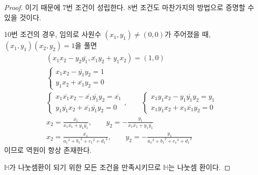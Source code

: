 \documentclass{article}
\newcommand{\ov}[1]{\ensuremath{\overline{#1}}}
\begin{document}
\begin{proof}
이기 때문에 7번 조건이 성립한다.
8번 조건도 마찬가지의 방법으로 증명할 수 있을 것이다.

10번 조건의 경우, 임의로 사원수 \((x_1,y_1)\neq(0,0)\)가 주어졌을 때, \((x_1,y_1)(x_2,y_2)=1\)을 풀면
\begin{gather*}
(x_1x_2-y_2\ov{y_1},\ov{x_1}y_2+y_1x_2)=(1,0)
\\
\begin{cases}
x_1x_2-\ov{y_1}y_2=1\\
y_1x_2+\ov{x_1}y_2=0
\end{cases}
\\
\begin{cases}
x_1\ov{x_1}x_2-\ov{x_1}\ov{y_1}y_2=\ov{x_1}\\
y_1\ov{y_1}x_2+\ov{x_1}\ov{y_1}y_2=0
\end{cases}
,\qquad
\begin{cases}
x_1y_1x_2-y_1\ov{y_1}y_2=y_1\\
x_1y_1x_2+x_1\ov{x_1}y_2=0
\end{cases}
\\
x_2=\frac{\ov{x_1}}{x_1\ov{x_1}+y_1\ov{y_1}}
,\qquad
y_2=-\frac{y_1}{x_1\ov{x_1}+y_1\ov{y_1}}
\\
x_2=\frac{\ov{x_1}}{{a_1}^2+{b_1}^2+{c_1}^2+{d_1}^2}
,\qquad
y_2=-\frac{y_1}{{a_1}^2+{b_1}^2+{c_1}^2+{d_1}^2}
\end{gather*}
이므로 역원이 항상 존재한다.

\(\mathbb H\)가 나눗셈환이 되기 위한 모든 조건을 만족시키므로 \(\mathbb H\)는 나눗셈 환이다.
\end{proof}
\end{document}
